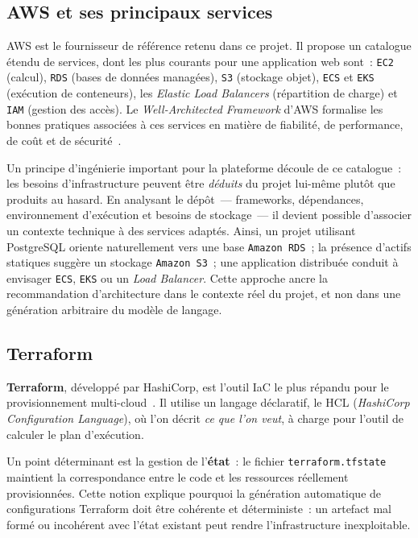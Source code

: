 \subsection{AWS et ses principaux services}

AWS est le fournisseur de référence retenu dans ce projet. Il propose un catalogue étendu de
services, dont les plus courants pour une application web sont~: \texttt{EC2} (calcul),
\texttt{RDS} (bases de données managées), \texttt{S3} (stockage objet), \texttt{ECS} et
\texttt{EKS} (exécution de conteneurs), les \textit{Elastic Load Balancers} (répartition de
charge) et \texttt{IAM} (gestion des accès). Le \textit{Well-Architected Framework} d'AWS
formalise les bonnes pratiques associées à ces services en matière de fiabilité, de
performance, de coût et de sécurité~\cite{AWS_WELL_ARCHITECTED}.

Un principe d'ingénierie important pour la plateforme découle de ce catalogue~: les besoins
d'infrastructure peuvent être \emph{déduits} du projet lui-même plutôt que produits au
hasard. En analysant le dépôt~--- frameworks, dépendances, environnement d'exécution et
besoins de stockage~--- il devient possible d'associer un contexte technique à des services
adaptés. Ainsi, un projet utilisant PostgreSQL oriente naturellement vers une base
\texttt{Amazon RDS}~; la présence d'actifs statiques suggère un stockage \texttt{Amazon S3}~;
une application distribuée conduit à envisager \texttt{ECS}, \texttt{EKS} ou un
\textit{Load Balancer}. Cette approche ancre la recommandation d'architecture dans le
contexte réel du projet, et non dans une génération arbitraire du modèle de langage.

\subsection{Terraform}

\textbf{Terraform}, développé par HashiCorp, est l'outil IaC le plus répandu pour le
provisionnement multi-cloud~\cite{TERRAFORM_DOCS}. Il utilise un langage déclaratif, le HCL
(\textit{HashiCorp Configuration Language}), où l'on décrit \textit{ce que l'on veut}, à
charge pour l'outil de calculer le plan d'exécution.

Un point déterminant est la gestion de l'\textbf{état}~: le fichier \texttt{terraform.tfstate}
maintient la correspondance entre le code et les ressources réellement provisionnées. Cette
notion explique pourquoi la génération automatique de configurations Terraform doit être
cohérente et déterministe~: un artefact mal formé ou incohérent avec l'état existant peut
rendre l'infrastructure inexploitable.

